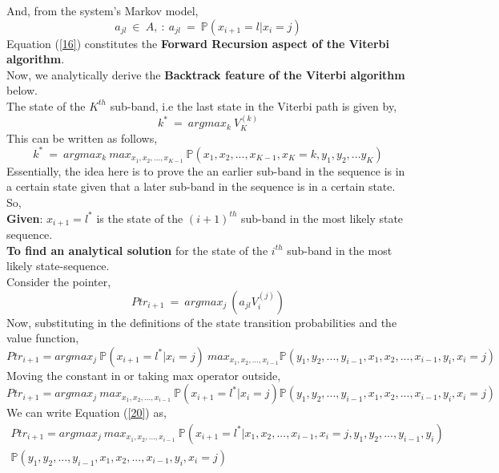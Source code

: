 \documentclass[12pt, draftcls, onecolumn]{IEEEtran}
\begin{document}
And, from the system's Markov model,
\[a_{jl}\ \in\ A,\ :\ a_{jl}\ =\ \mathbb P(x_{i+1}=l|x_i=j)\]
Equation (\ref{16}) constitutes the \textbf{Forward Recursion aspect of the Viterbi algorithm}.
\\Now, we analytically derive the \textbf{Backtrack feature of the Viterbi algorithm} below.
\\The state of the $K^{th}$ sub-band, i.e the last state in the Viterbi path is given by,
\begin{equation}\label{17}
    k^*\ =\ argmax_k\ V_K^{(k)}
\end{equation}
This can be written as follows,
\begin{equation}\label{18}
    k^*\ =\ argmax_k\ max_{x_1,x_2,...,x_{K-1}}\ \mathbb P(x_1,x_2,...,x_{K-1},x_K=k,y_1,y_2,...y_K)
\end{equation}
Essentially, the idea here is to prove the an earlier sub-band in the sequence is in a certain state given that a later sub-band in the sequence is in a certain state.
\\So,
\\\textbf{Given}: $x_{i+1}=l^*$ is the state of the $(i+1)^{th}$ sub-band in the most likely state sequence.
\\\textbf{To find an analytical solution} for the state of the $i^{th}$ sub-band in the most likely state-sequence.
\\Consider the pointer,
\[Ptr_{i+1}\ =\ argmax_j\ (a_{jl}V_{i}^{(j)})\]
Now, substituting in the definitions of the state transition probabilities and the value function,
\begin{equation}\label{19}
    Ptr_{i+1}=argmax_j\ \mathbb P(x_{i+1}=l^*|x_{i}=j)\ max_{x_1,x_2,...,x_{i-1}}\mathbb P(y_1,y_2,...,y_{i-1},x_1,x_2,...,x_{i-1},y_i,x_{i}=j)
\end{equation}
Moving the constant in or taking max operator outside,
\begin{equation}\label{20}
    Ptr_{i+1}=argmax_j\ max_{x_1,x_2,...,x_{i-1}}\ \mathbb P(x_{i+1}=l^*|x_{i}=j)\mathbb P(y_1,y_2,...,y_{i-1},x_1,x_2,...,x_{i-1},y_i,x_{i}=j)
\end{equation}
We can write Equation (\ref{20}) as,
\begin{equation}\label{21}
    \begin{aligned}
        Ptr_{i+1}=argmax_j\ max_{x_1,x_2,...,x_{i-1}}\ \mathbb P(x_{i+1}=l^*|x_1,x_2,...,x_{i-1},x_{i}=j,y_1,y_2,...,y_{i-1},y_{i})\\\mathbb P(y_1,y_2,...,y_{i-1},x_1,x_2,...,x_{i-1},y_i,x_{i}=j)
    \end{aligned}
\end{equation}
\end{document}
